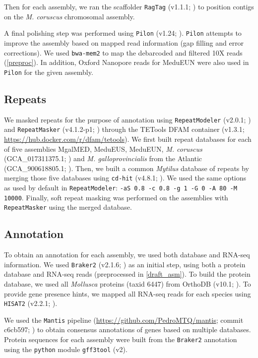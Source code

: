 \documentclass[11pt, a4paper]{article}
\begin{document}
Then for each assembly, we ran the scaffolder \texttt{RagTag} (v1.1.1; \cite{Alonge2021}) to position contigs on the \emph{M. coruscus} chromosomal assembly.

A final polishing step was performed using \texttt{Pilon} (v1.24; \cite{Walker2014}).
\texttt{Pilon} attempts to improve the assembly based on mapped read information (gap filling and error corrections).
We used \texttt{bwa-mem2} to map the debarcoded and filtered 10X reads (\cref{preproc}).
In addition, Oxford Nanopore reads for MeduEUN were also used in \texttt{Pilon} for the given assembly.

\subsection{Repeats}

We masked repeats for the purpose of annotation using \texttt{RepeatModeler} (v2.0.1; \cite{Flynn2020}) and \texttt{RepeatMasker} (v4.1.2-p1; \cite{Smit2013}) through the TETools DFAM container (v1.3.1; \url{https://hub.docker.com/r/dfam/tetools}).
We first built repeat databases for each of five assemblies MgalMED, MeduEUS, MeduEUN, \textit{M. coruscus} (GCA\_017311375.1; \cite{Yang2021}) and \textit{M. galloprovincialis} from the Atlantic (GCA\_900618805.1; \cite{Gerdol2020}).
Then, we built a common \textit{Mytilus} database of repeats by merging those five databases using \texttt{cd-hit} (v4.8.1; \cite{Fu2012}). We used the same options as used by default in \texttt{RepeatModeler}: \texttt{-aS 0.8 -c 0.8 -g 1 -G 0 -A 80 -M 10000}.
Finally, soft repeat masking was performed on the assemblies with \texttt{RepeatMasker} using the merged database.

\subsection{Annotation}

To obtain an annotation for each assembly, we used both database and RNA-seq information.
We used \texttt{Braker2} (v2.1.6; \cite{Bruna2021}) as an initial step, using both a protein database and RNA-seq reads (preprocessed in \cref{draft_asm}).
To build the protein database, we used all \textit{Mollusca} proteins (taxid 6447) from OrthoDB (v10.1; \cite{Kriventseva2019}).
To provide gene presence hints, we mapped all RNA-seq reads for each species using \texttt{HISAT2} (v2.2.1; \cite{Kim2019}).

We used the \texttt{Mantis} pipeline (\url{https://github.com/PedroMTQ/mantis}; commit c6cb597; \cite{Queiros2021}) to obtain consensus annotations of genes based on multiple databases.
Protein sequences for each assembly were built from the \texttt{Braker2} annotation using the \texttt{python} module \texttt{gff3tool} (v2).
\end{document}
